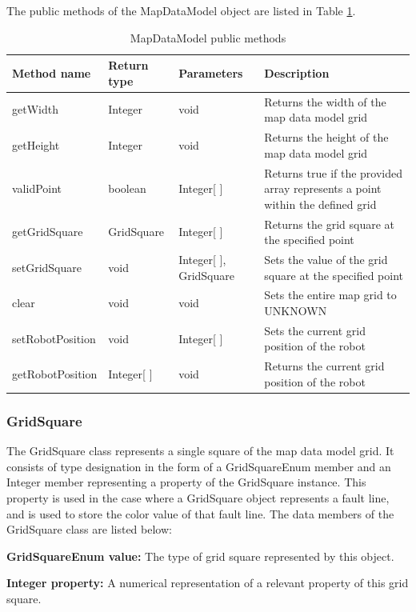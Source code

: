 \documentclass[12pt]{article}
\begin{document}
The public methods of the MapDataModel object are listed in Table \ref{table:mapdatamodel}.


\begin{table}
\begin{tabular}{ | p{} | p{} |p{}|p{}|}
\hline
\textbf{Method name} & \textbf{Return type} & \textbf{Parameters} & \textbf{Description} \\
\hline
getWidth & Integer & void & Returns the width of the map data model grid \\
\hline
getHeight & Integer & void & Returns the height of the map data model grid \\
\hline
validPoint & boolean & Integer[ ] & Returns true if the provided array represents a point within the defined grid \\
\hline
getGridSquare & GridSquare & Integer[ ] & Returns the grid square at the specified point \\
\hline
setGridSquare & void & Integer[ ], GridSquare & Sets the value of the grid square at the specified point \\
\hline
clear & void & void & Sets the entire map grid to UNKNOWN \\
\hline
setRobotPosition & void & Integer[ ] & Sets the current grid position of the robot \\
\hline
getRobotPosition & Integer[ ] & void & Returns the current grid position of the robot \\
\hline
\end{tabular}
\caption{MapDataModel public methods}
\label{table:mapdatamodel}
\end{table}

\subsubsection{GridSquare}
The GridSquare class represents a single square of the map data model grid. It consists of type designation in the form of a GridSquareEnum member and an Integer member representing a property of the GridSquare instance. This property is used in the case where a GridSquare object represents a fault line, and is used to store the color value of that fault line. The data members of the GridSquare class are listed below:

\begin{description}
\item{\textbf{GridSquareEnum value: }} The type of grid square represented by this object.
\item{\textbf{Integer property: }} A numerical representation of a relevant property of this grid square.
\end{description}
\end{document}
